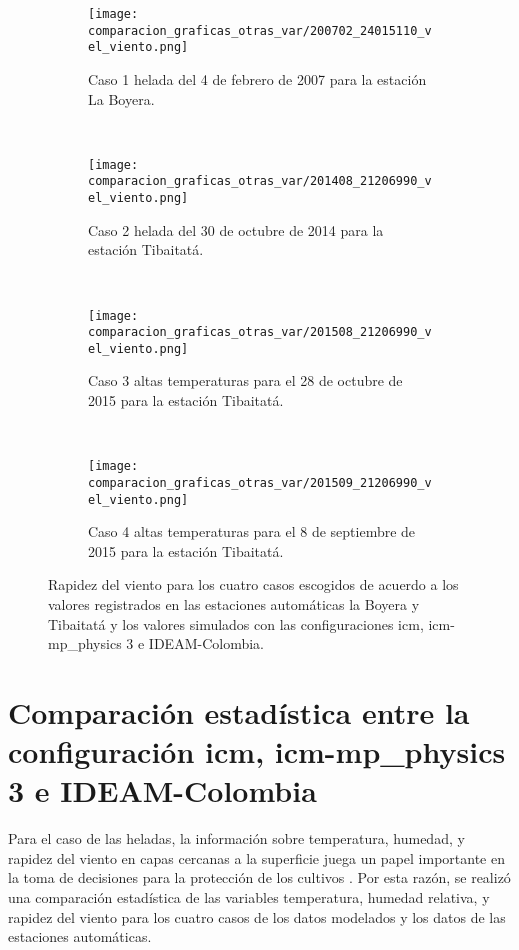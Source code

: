 \begin{figure}[H]
    
\begin{subfigure}[normla]{0.4\textwidth}
\caption{Caso 1 helada del 4 de febrero de 2007 para la estación La Boyera.}
\label{caso1_tiba_wrf_vv}
\texttt{[image: comparacion\_graficas\_otras\_var/200702\_24015110\_vel\_viento.png]}
\end{subfigure}
~
\begin{subfigure}[normla]{0.4\textwidth}
\caption{Caso 2 helada del 30 de octubre de 2014 para la estación Tibaitatá.}
\label{caso2_tiba_wrf_vv}
\texttt{[image: comparacion\_graficas\_otras\_var/201408\_21206990\_vel\_viento.png]}
\end{subfigure}
~
\centering
\begin{subfigure}[normla]{0.4\textwidth}
\caption{Caso 3 altas temperaturas para el 28 de octubre de 2015 para la estación Tibaitatá.}
\label{caso3_tiba_wrf_vv}
\texttt{[image: comparacion\_graficas\_otras\_var/201508\_21206990\_vel\_viento.png]}
\end{subfigure}
~
\centering
\begin{subfigure}[normla]{0.4\textwidth}
\caption{Caso 4 altas temperaturas para el 8 de septiembre de 2015 para la estación Tibaitatá.}
\label{caso4_tiba_wrf_vv}
\texttt{[image: comparacion\_graficas\_otras\_var/201509\_21206990\_vel\_viento.png]}
\end{subfigure}

    \caption{Rapidez del viento para los cuatro casos escogidos de acuerdo a los valores registrados en las estaciones automáticas la Boyera y Tibaitatá y los valores simulados con las configuraciones icm, icm-mp\_physics 3 e IDEAM-Colombia.}
    \label{fig:wrf_vv_tibaitata}
\end{figure}


\section{Comparación estadística entre la configuración icm, icm-mp\_physics 3 e IDEAM-Colombia}

Para el caso de las heladas, la información sobre temperatura, humedad, y rapidez del viento en capas cercanas a la superficie juega un papel importante en la toma de decisiones para la protección de los cultivos \citep{prabha2008}. Por esta razón, se realizó una comparación estadística de las variables temperatura, humedad relativa, y rapidez del viento para los cuatro casos de los datos modelados y los datos de las estaciones automáticas.\\

